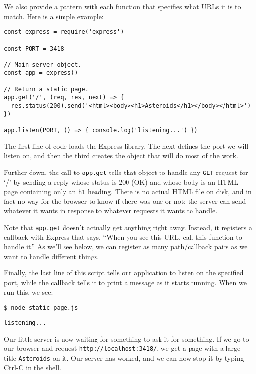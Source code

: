 We also provide a pattern with each function that specifies what URLs it is to match.
Here is a simple example:

\begin{verbatim}
const express = require('express')

const PORT = 3418

// Main server object.
const app = express()

// Return a static page.
app.get('/', (req, res, next) => {
  res.status(200).send('<html><body><h1>Asteroids</h1></body></html>')
})

app.listen(PORT, () => { console.log('listening...') })
\end{verbatim}

The first line of code loads the Express library.
The next defines the port we will listen on,
and then the third creates the object that will do most of the work.

Further down,
the call to \texttt{app.get} tells that object to handle any \texttt{GET} request for `/'
by sending a reply whose status is 200 (OK)
and whose body is an HTML page containing only an \texttt{h1} heading.
There is no actual HTML file on disk,
and in fact no way for the browser to know if there was one or not:
the server can send whatever it wants in response to whatever requests it wants to handle.

Note that \texttt{app.get} doesn't actually get anything right away.
Instead,
it registers a callback with Express that says,
``When you see this URL, call this function to handle it.''
As we'll see below,
we can register as many path/callback pairs as we want to handle different things.

Finally,
the last line of this script tells our application to listen on the specified port,
while the callback tells it to print a message as it starts running.
When we run this, we see:

\begin{verbatim}
$ node static-page.js
\end{verbatim}

\begin{verbatim}
listening...
\end{verbatim}

Our little server is now waiting for something to ask it for something.
If we go to our browser and request \texttt{http://localhost:3418/},
we get a page with a large title \texttt{Asteroids} on it.
Our server has worked,
and we can now stop it by typing Ctrl-C in the shell.


